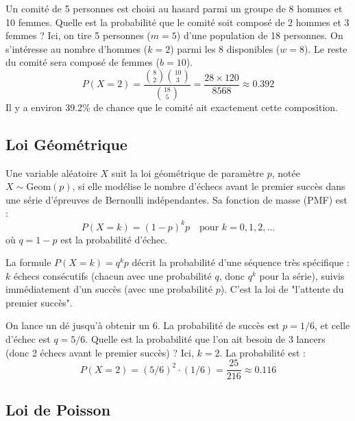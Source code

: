 \begin{examplebox}
Un comité de 5 personnes est choisi au hasard parmi un groupe de 8 hommes et 10 femmes. Quelle est la probabilité que le comité soit composé de 2 hommes et 3 femmes ?
Ici, on tire 5 personnes ($m=5$) d'une population de 18 personnes. On s'intéresse au nombre d'hommes ($k=2$) parmi les 8 disponibles ($w=8$). Le reste du comité sera composé de femmes ($b=10$).
$$ P(X=2) = \frac{\binom{8}{2} \binom{10}{3}}{\binom{18}{5}} = \frac{28 \times 120}{8568} \approx 0.392 $$
Il y a environ 39.2\% de chance que le comité ait exactement cette composition.
\end{examplebox}

\subsection{Loi Géométrique}

\begin{theorembox}
Une variable aléatoire $X$ suit la loi géométrique de paramètre $p$, notée $X \sim \text{Geom}(p)$, si elle modélise le nombre d'échecs avant le premier succès dans une série d'épreuves de Bernoulli indépendantes. Sa fonction de masse (PMF) est :
$$ P(X=k) = (1-p)^k p \quad \text{pour } k=0, 1, 2, \dots $$
où $q = 1-p$ est la probabilité d'échec.
\end{theorembox}

\begin{intuitionbox}
La formule $P(X=k) = q^k p$ décrit la probabilité d'une séquence très spécifique : $k$ échecs consécutifs (chacun avec une probabilité $q$, donc $q^k$ pour la série), suivis immédiatement d'un succès (avec une probabilité $p$). C'est la loi de "l'attente du premier succès".
\end{intuitionbox}

\begin{examplebox}
On lance un dé jusqu'à obtenir un 6. La probabilité de succès est $p=1/6$, et celle d'échec est $q=5/6$. Quelle est la probabilité que l'on ait besoin de 3 lancers (donc 2 échecs avant le premier succès) ?
Ici, $k=2$. La probabilité est :
$$ P(X=2) = (5/6)^2 \cdot (1/6) = \frac{25}{216} \approx 0.116 $$
\end{examplebox}

\subsection{Loi de Poisson}

